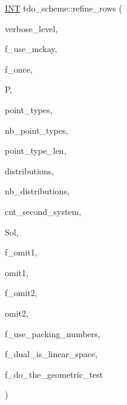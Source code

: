 {\footnotesize\ttfamily \mbox{\hyperlink{galois_8h_a09fddde158a3a20bd2dcadb609de11dc}{I\+NT}} tdo\+\_\+scheme\+::refine\+\_\+rows (\begin{DoxyParamCaption}\item[{\mbox{\hyperlink{galois_8h_a09fddde158a3a20bd2dcadb609de11dc}{I\+NT}}}]{verbose\+\_\+level,  }\item[{\mbox{\hyperlink{galois_8h_a09fddde158a3a20bd2dcadb609de11dc}{I\+NT}}}]{f\+\_\+use\+\_\+mckay,  }\item[{\mbox{\hyperlink{galois_8h_a09fddde158a3a20bd2dcadb609de11dc}{I\+NT}}}]{f\+\_\+once,  }\item[{\mbox{\hyperlink{classpartitionstack}{partitionstack}} \&}]{P,  }\item[{\mbox{\hyperlink{galois_8h_a09fddde158a3a20bd2dcadb609de11dc}{I\+NT}} $\ast$\&}]{point\+\_\+types,  }\item[{\mbox{\hyperlink{galois_8h_a09fddde158a3a20bd2dcadb609de11dc}{I\+NT}} \&}]{nb\+\_\+point\+\_\+types,  }\item[{\mbox{\hyperlink{galois_8h_a09fddde158a3a20bd2dcadb609de11dc}{I\+NT}} \&}]{point\+\_\+type\+\_\+len,  }\item[{\mbox{\hyperlink{galois_8h_a09fddde158a3a20bd2dcadb609de11dc}{I\+NT}} $\ast$\&}]{distributions,  }\item[{\mbox{\hyperlink{galois_8h_a09fddde158a3a20bd2dcadb609de11dc}{I\+NT}} \&}]{nb\+\_\+distributions,  }\item[{\mbox{\hyperlink{galois_8h_a09fddde158a3a20bd2dcadb609de11dc}{I\+NT}} \&}]{cnt\+\_\+second\+\_\+system,  }\item[{\mbox{\hyperlink{structsolution__file__data}{solution\+\_\+file\+\_\+data}} $\ast$}]{Sol,  }\item[{\mbox{\hyperlink{galois_8h_a09fddde158a3a20bd2dcadb609de11dc}{I\+NT}}}]{f\+\_\+omit1,  }\item[{\mbox{\hyperlink{galois_8h_a09fddde158a3a20bd2dcadb609de11dc}{I\+NT}}}]{omit1,  }\item[{\mbox{\hyperlink{galois_8h_a09fddde158a3a20bd2dcadb609de11dc}{I\+NT}}}]{f\+\_\+omit2,  }\item[{\mbox{\hyperlink{galois_8h_a09fddde158a3a20bd2dcadb609de11dc}{I\+NT}}}]{omit2,  }\item[{\mbox{\hyperlink{galois_8h_a09fddde158a3a20bd2dcadb609de11dc}{I\+NT}}}]{f\+\_\+use\+\_\+packing\+\_\+numbers,  }\item[{\mbox{\hyperlink{galois_8h_a09fddde158a3a20bd2dcadb609de11dc}{I\+NT}}}]{f\+\_\+dual\+\_\+is\+\_\+linear\+\_\+space,  }\item[{\mbox{\hyperlink{galois_8h_a09fddde158a3a20bd2dcadb609de11dc}{I\+NT}}}]{f\+\_\+do\+\_\+the\+\_\+geometric\+\_\+test }\end{DoxyParamCaption})}

